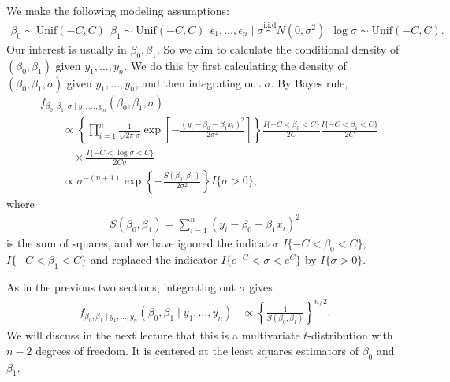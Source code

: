 \documentclass{scrartcl}
\begin{document}
We make the following modeling assumptions:
\begin{align*}
  \beta_0 \sim \text{Unif}(-C, C) ~~ \beta_1 \sim \text{Unif}(-C, C)
  ~~ \epsilon_1, \dots, \epsilon_n \mid \sigma
  \overset{\text{i.i.d}}{\sim} N(0, \sigma^2) ~~ \log \sigma \sim
  \text{Unif}(-C, C). 
\end{align*}
Our interest is usually in $\beta_0, \beta_1$. So we aim to calculate
the conditional density of $(\beta_0, \beta_1)$ given $y_1, \dots,
y_n$. We do this by first calculating the density of $(\beta_0,
\beta_1, \sigma)$ given $y_1, \dots, y_n$, and then integrating out
$\sigma$. By Bayes rule, 
\begin{align*}
  &f_{\beta_0,\beta_1,\sigma\mid y_1,\ldots,y_n}
  (\beta_0,\beta_1,\sigma) \\
  &\qquad\propto
  \left\{\prod_{i=1}^n
  \frac{1}{\sqrt{2\pi}\sigma}
  \exp\left[-\frac{(y_i-\beta_0-\beta_1x_i)^2}{2\sigma^2}\right]
  \right\}
  \frac{I\{-C<\beta_0<C\}}{2C}
  \frac{I\{-C<\beta_1<C\}}{2C} \\
  &\qquad\quad\times
  \frac{ I\{-C<\log\sigma<C\}}{2C\sigma} \\
  &\qquad\propto \sigma^{-(n+1)}
  \exp\left\{-\frac{S(\beta_0,\beta_1)}{2\sigma^2}\right\} I\{\sigma >
    0\},
\end{align*}
where 
\begin{align*}
  S(\beta_0,\beta_1) =\sum_{i=1}^n(y_i-\beta_0-\beta_1x_i)^2
\end{align*}
is the sum of squares, and we have ignored the indicator $I\{-C <
\beta_0 < C\}$, $I\{-C < 
\beta_1 < C\}$ and replaced the indicator $I\{e^{-C} < \sigma < e^C\}$
by $I\{\sigma > 0\}$. 

As in the previous two sections, integrating out $\sigma$ gives 
\begin{align*}
  f_{\beta_0,\beta_1\mid y_1,\ldots,y_n}
  (\beta_0,\beta_1\mid y_1,\ldots,y_n)
  &\propto
  \left\{\frac{1}{S(\beta_0,\beta_1)}\right\}^{n/2}.
\end{align*}
We will discuss in the next lecture that this is a multivariate
$t$-distribution with $n-2$ degrees of freedom. It is centered at the
least squares estimators of $\beta_0$ and $\beta_1$. 
\end{document}
